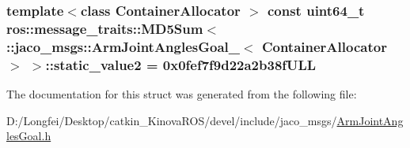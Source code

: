 \subsubsection[{\texorpdfstring{static\+\_\+value2}{static_value2}}]{\setlength{\rightskip}{0pt plus 5cm}template$<$class Container\+Allocator $>$ const uint64\+\_\+t ros\+::message\+\_\+traits\+::\+M\+D5\+Sum$<$ \+::{\bf jaco\+\_\+msgs\+::\+Arm\+Joint\+Angles\+Goal\+\_\+}$<$ Container\+Allocator $>$ $>$\+::static\+\_\+value2 = 0x0fef7f9d22a2b38f\+U\+LL\hspace{0.3cm}{\ttfamily [static]}}\hypertarget{structros_1_1message__traits_1_1MD5Sum_3_01_1_1jaco__msgs_1_1ArmJointAnglesGoal___3_01ContainerAllocator_01_4_01_4_a1204b6c7638a089ab15d1c1e460e70bd}{}\label{structros_1_1message__traits_1_1MD5Sum_3_01_1_1jaco__msgs_1_1ArmJointAnglesGoal___3_01ContainerAllocator_01_4_01_4_a1204b6c7638a089ab15d1c1e460e70bd}


The documentation for this struct was generated from the following file\+:\begin{DoxyCompactItemize}
\item 
D\+:/\+Longfei/\+Desktop/catkin\+\_\+\+Kinova\+R\+O\+S/devel/include/jaco\+\_\+msgs/\hyperlink{ArmJointAnglesGoal_8h}{Arm\+Joint\+Angles\+Goal.\+h}\end{DoxyCompactItemize}
